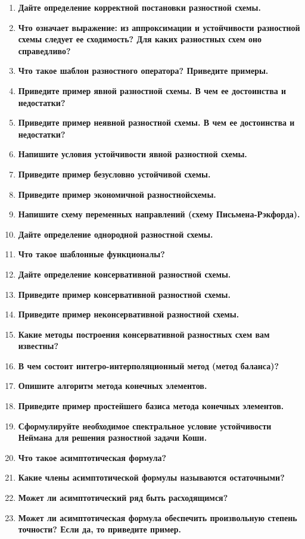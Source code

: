 \begin{enumerate}[label=\textbf{\underline{\arabic*.}}]
\item \textbf{Дайте определение корректной постановки разностной схемы.}
\item \textbf{Что означает выражение: из аппроксимации и устойчивости разностной схемы следует ее сходимость? Для каких разностных схем оно справедливо?}
\item \textbf{Что такое шаблон разностного оператора? Приведите примеры.}
\item \textbf{Приведите пример явной разностной схемы. В чем ее достоинства и недостатки?}
\item \textbf{Приведите пример неявной разностной схемы. В чем ее достоинства и недостатки?}
\item \textbf{Напишите условия устойчивости явной разностной схемы.}
\item \textbf{Приведите пример безусловно устойчивой схемы.}
\item \textbf{Приведите пример экономичной разностнойсхемы.}
\item \textbf{Напишите схему переменных направлений (схему Письмена-Рэкфорда).}
\item \textbf{Дайте определение однородной разностной схемы.}
\item \textbf{Что такое шаблонные функционалы?}
\item \textbf{Дайте определение консервативной разностной схемы.}
\item \textbf{Приведите пример консервативной разностной схемы.}
\item \textbf{Приведите пример неконсервативной разностной схемы.}
\item \textbf{Какие методы построения консервативной разностных схем вам известны?}
\item \textbf{В чем состоит интегро-интерполяционный метод (метод баланса)?}
\item \textbf{Опишите алгоритм метода конечных элементов.}
\item \textbf{Приведите пример простейшего базиса метода конечных элементов.}
\item \textbf{Сформулируйте необходимое спектральное условие устойчивости Неймана для решения разностной задачи Коши.}
\item \textbf{Что такое асимптотическая формула?}
\item \textbf{Какие члены асимптотической формулы называются остаточными?}
\item \textbf{Может ли асимптотический ряд быть расходящимся?}
\item \textbf{Может ли асимптотическая формула обеспечить произвольную степень точности? Если да, то приведите пример.}

\end{enumerate}
